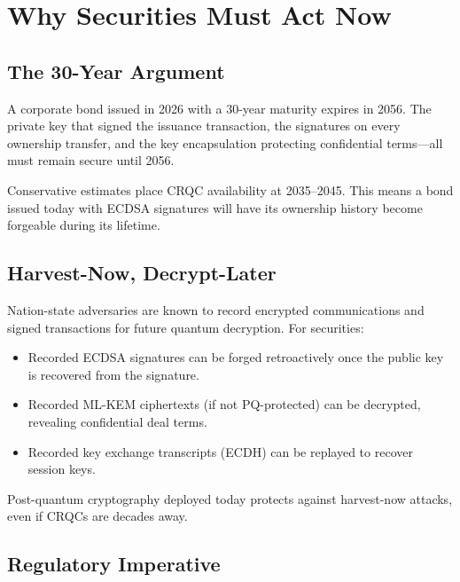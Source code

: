 \section{Why Securities Must Act Now}

\label{sec:urgency}

\subsection{The 30-Year Argument}

A corporate bond issued in 2026 with a 30-year maturity expires in
2056.  The private key that signed the issuance transaction, the
signatures on every ownership transfer, and the key encapsulation
protecting confidential terms---all must remain secure until 2056.

Conservative estimates place CRQC availability at 2035--2045.  This
means a bond issued today with ECDSA signatures will have its
ownership history become forgeable during its lifetime.

\subsection{Harvest-Now, Decrypt-Later}

Nation-state adversaries are known to record encrypted communications
and signed transactions for future quantum decryption.  For securities:

\begin{itemize}[nosep]
  \item Recorded ECDSA signatures can be forged retroactively once
        the public key is recovered from the signature.
  \item Recorded ML-KEM ciphertexts (if not PQ-protected) can be
        decrypted, revealing confidential deal terms.
  \item Recorded key exchange transcripts (ECDH) can be replayed to
        recover session keys.
\end{itemize}

Post-quantum cryptography deployed today protects against harvest-now
attacks, even if CRQCs are decades away.

\subsection{Regulatory Imperative}

